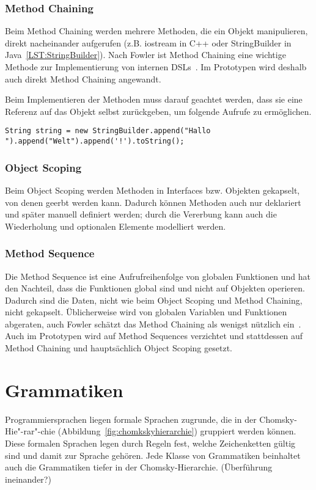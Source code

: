 \documentclass[../InterneDSLs.tex]{subfiles}
\begin{document}
\subsection{Method Chaining}
Beim Method Chaining werden mehrere Methoden, die ein Objekt manipulieren, direkt nacheinander aufgerufen (z.B. iostream in C++ oder StringBuilder in Java~\ref{LST:StringBuilder}). Nach Fowler ist Method Chaining eine wichtige Methode zur Implementierung von internen DSLs~\cite[S.~373]{Fowler.2010}. Im Prototypen wird deshalb auch direkt Method Chaining angewandt.

Beim Implementieren der Methoden muss darauf geachtet werden, dass sie eine Referenz auf das Objekt selbst zurückgeben, um folgende Aufrufe zu ermöglichen.

\begin{lstlisting}[label=LST:StringBuilder,caption={Method Chaining beim StringBuilder}]
String string = new StringBuilder.append("Hallo ").append("Welt").append('!').toString();
\end{lstlisting}

\subsection{Object Scoping}
Beim Object Scoping werden Methoden in Interfaces bzw. Objekten gekapselt, von denen geerbt werden kann. Dadurch können Methoden auch nur deklariert und später manuell definiert werden; durch die Vererbung kann auch die Wiederholung und optionalen Elemente modelliert werden.

\subsection{Method Sequence}
Die Method Sequence ist eine Aufrufreihenfolge von globalen Funktionen und hat den Nachteil, dass die Funktionen global sind und nicht auf Objekten operieren. Dadurch sind die Daten, nicht wie beim Object Scoping und Method Chaining, nicht gekapselt. Üblicherweise wird von globalen Variablen und Funktionen abgeraten, auch Fowler schätzt das Method Chaining als wenigst nützlich ein~\cite[S. 352]{Fowler.2010}. Auch im Prototypen wird auf Method Sequences verzichtet und stattdessen auf Method Chaining und hauptsächlich Object Scoping gesetzt.

\chapter{Grammatiken}\label{SEC:Grammars}
Programmiersprachen liegen formale Sprachen zugrunde, die in der Chomsky-Hie"-rar"-chie (Abbildung~\ref{fig:chomkskyhierarchie}) gruppiert werden können. Diese formalen Sprachen legen durch Regeln fest, welche Zeichenketten gültig sind und damit zur Sprache gehören. Jede Klasse von Grammatiken beinhaltet auch die Grammatiken tiefer in der Chomsky-Hierarchie. (Überführung ineinander?)
\end{document}
